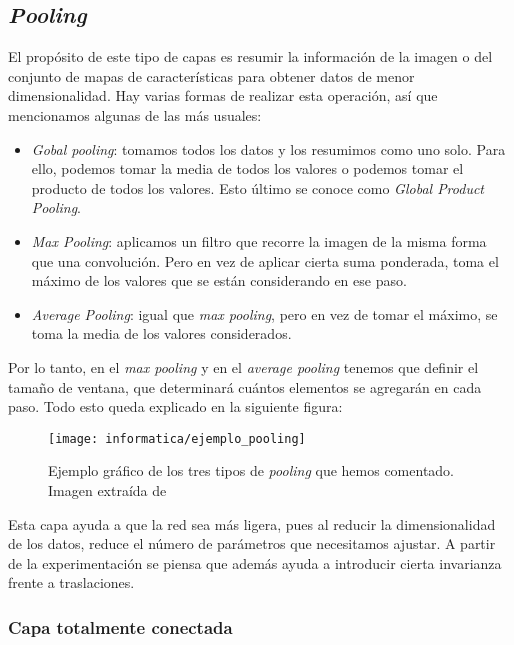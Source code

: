 \subsection{\textit{Pooling}}

El propósito de este tipo de capas es resumir la información de la imagen o del conjunto de mapas de características para obtener datos de menor dimensionalidad. Hay varias formas de realizar esta operación, así que mencionamos algunas de las más usuales:

\begin{itemize}
    \item \textit{Gobal pooling}: tomamos todos los datos y los resumimos como uno solo. Para ello, podemos tomar la media de todos los valores o podemos tomar el producto de todos los valores. Esto último se conoce como \textit{Global Product Pooling}.
    \item \textit{Max Pooling}: aplicamos un filtro que recorre la imagen de la misma forma que una convolución. Pero en vez de aplicar cierta suma ponderada, toma el máximo de los valores que se están considerando en ese paso.
    \item \textit{Average Pooling}: igual que \textit{max pooling}, pero en vez de tomar el máximo, se toma la media de los valores considerados.
\end{itemize}

Por lo tanto, en el \textit{max pooling} y en el \textit{average pooling} tenemos que definir el tamaño de ventana, que determinará cuántos elementos se agregarán en cada paso. Todo esto queda explicado en la siguiente figura:

\begin{figure}[H]
    \centering
    \texttt{[image: informatica/ejemplo\_pooling]}
    \caption{Ejemplo gráfico de los tres tipos de \textit{pooling} que hemos comentado. Imagen extraída de \cite{informatica:paper_definicion_cnn}}
\end{figure}

Esta capa ayuda a que la red sea más ligera, pues al reducir la dimensionalidad de los datos, reduce el número de parámetros que necesitamos ajustar. A partir de la experimentación se piensa que además ayuda a introducir cierta invarianza frente a traslaciones.

\subsubsection{Capa totalmente conectada} \label{subsubs:capa_totalmente_conectada}

